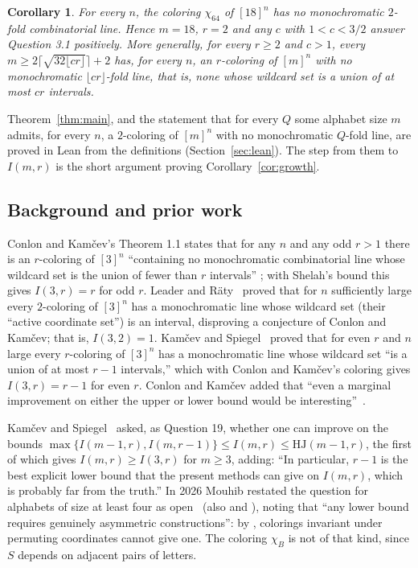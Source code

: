 \documentclass[11pt]{article}
\newtheorem{corollary}[theorem]{Corollary}
\theoremstyle{remark}
\begin{document}
\begin{corollary}\label{cor:question}
For every $n$, the coloring $\chi_{64}$ of $[18]^n$ has no monochromatic $2$-fold combinatorial line. Hence $m=18$, $r=2$ and any $c$ with $1<c<3/2$ answer Question 3.1 positively. More generally, for every $r\ge2$ and $c>1$, every $m\ge 2\lceil\sqrt{32\lfloor cr\rfloor}\rceil+2$ has, for every $n$, an $r$-coloring of $[m]^n$ with no monochromatic $\lfloor cr\rfloor$-fold line, that is, none whose wildcard set is a union of at most $cr$ intervals.
\end{corollary}

Theorem~\ref{thm:main}, and the statement that for every $Q$ some alphabet size $m$ admits, for every $n$, a $2$-coloring of $[m]^n$ with no monochromatic $Q$-fold line, are proved in Lean from the definitions (Section~\ref{sec:lean}). The step from them to $I(m,r)$ is the short argument proving Corollary~\ref{cor:growth}.

\subsection{Background and prior work}

Conlon and Kamčev's Theorem 1.1 states that for any $n$ and any odd $r>1$ there is an $r$-coloring of $[3]^n$ ``containing no monochromatic combinatorial line whose wildcard set is the union of fewer than $r$ intervals'' \cite{CK}; with Shelah's bound this gives $I(3,r)=r$ for odd $r$. Leader and Räty~\cite[Theorem 2]{LR} proved that for $n$ sufficiently large every $2$-coloring of $[3]^n$ has a monochromatic line whose wildcard set (their ``active coordinate set'') is an interval, disproving a conjecture of Conlon and Kamčev; that is, $I(3,2)=1$. Kamčev and Spiegel~\cite[Theorem 2]{KS} proved that for even $r$ and $n$ large every $r$-coloring of $[3]^n$ has a monochromatic line whose wildcard set ``is a union of at most $r-1$ intervals,'' which with Conlon and Kamčev's coloring gives $I(3,r)=r-1$ for even $r$. Conlon and Kamčev added that ``even a marginal improvement on either the upper or lower bound would be interesting''~\cite[Section 3]{CK}.

Kamčev and Spiegel~\cite[Section 3]{KS} asked, as Question 19, whether one can improve on the bounds $\max\{I(m-1,r),I(m,r-1)\}\le I(m,r)\le\mathrm{HJ}(m-1,r)$, the first of which gives $I(m,r)\ge I(3,r)$ for $m\ge3$, adding: ``In particular, $r-1$ is the best explicit lower bound that the present methods can give on $I(m,r)$, which is probably far from the truth.'' In 2026 Mouhib restated the question for alphabets of size at least four as open~\cite[Question 66]{MouhibLB} (also \cite[Question 8.9]{MouhibOW} and \cite[Question 4.21]{MouhibThesis}), noting that ``any lower bound requires genuinely asymmetric constructions'': by \cite[Proposition 51]{MouhibLB}, colorings invariant under permuting coordinates cannot give one. The coloring $\chi_B$ is not of that kind, since $S$ depends on adjacent pairs of letters.
\end{document}
